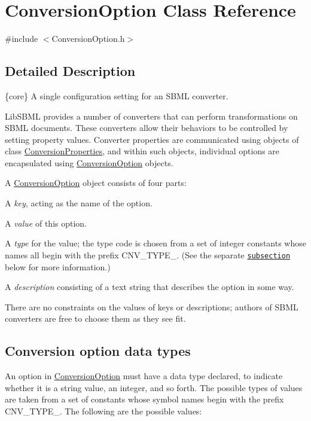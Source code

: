 \hypertarget{class_conversion_option}{}\section{Conversion\+Option Class Reference}
\label{class_conversion_option}


{\ttfamily \#include $<$Conversion\+Option.\+h$>$}



\subsection{Detailed Description}
\{core\} A single configuration setting for an S\+B\+ML converter.



Lib\+S\+B\+ML provides a number of converters that can perform transformations on S\+B\+ML documents. These converters allow their behaviors to be controlled by setting property values. Converter properties are communicated using objects of class \hyperlink{class_conversion_properties}{Conversion\+Properties}, and within such objects, individual options are encapsulated using \hyperlink{class_conversion_option}{Conversion\+Option} objects.

A \hyperlink{class_conversion_option}{Conversion\+Option} object consists of four parts\+: \begin{DoxyItemize}
\item A {\itshape key}, acting as the name of the option. \item A {\itshape value} of this option. \item A {\itshape type} for the value; the type code is chosen from a set of integer constants whose names all begin with the prefix {\ttfamily C\+N\+V\+\_\+\+T\+Y\+P\+E\+\_\+}. (See the separate \href{#ConversionOptionType_t}{\tt subsection} below for more information.) \item A {\itshape description} consisting of a text string that describes the option in some way.\end{DoxyItemize}
There are no constraints on the values of keys or descriptions; authors of S\+B\+ML converters are free to choose them as they see fit.\hypertarget{class_conversion_option_ConversionOptionType_t}{}\subsection{Conversion option data types}\label{class_conversion_option_ConversionOptionType_t}
An option in \hyperlink{class_conversion_option}{Conversion\+Option} must have a data type declared, to indicate whether it is a string value, an integer, and so forth. The possible types of values are taken from a set of constants whose symbol names begin with the prefix {\ttfamily C\+N\+V\+\_\+\+T\+Y\+P\+E\+\_\+}. The following are the possible values\+:

